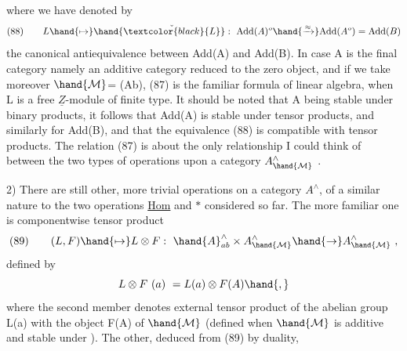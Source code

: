 where we have denoted by
\[
(88)\qquad L\hand{\mapsto}\hand{\check{\textcolor{black}{L}}} : \ \mathrm{Add}(A)^{o}\hand{\xrightarrow{\approx}}\mathrm{Add}(A^{o})= \mathrm{Add}(B)
\]
the canonical antiequivalence between Add(A) and Add(B). In case A is
the final category namely an additive category reduced to the zero object,
 and if we take moreover $\hand{\mathcal{M}}$= (Ab), (87) is the familiar formula of
linear algebra,  when L is a free $\underline{Z}$-module of finite type. It should be
noted that A being stable under binary products, it follows that Add(A)
is stable under tensor products, and similarly for Add(B), and that
the equivalence (88) is compatible with tensor products. The relation
(87) is about the only relationship I could think of between the two types
of operations upon a  category $A^{\wedge}_{\hand{\mathcal{M}}}$ . 

2) There are still  other, more trivial operations on a category $A^{\wedge}$,
of a  similar nature to the two operations \uline{Hom} and $*$ considered so
far. The more familiar one is componentwise tensor product
\[
(89)\qquad (L,F)\hand{\mapsto} L\otimes F : \ \hand{A}^{\wedge}_{ab}\times A^{\wedge}_{\hand{\mathcal{M}}}\hand{\to} A^{\wedge}_{\hand{\mathcal{M}}} \ ,
\]
defined by
\[
L\otimes F\ (a) \ = L(a)\otimes F(A)\hand{,}
\]
where the second member denotes external tensor product of the abelian
group L(a) with the object F(A) of $\hand{\mathcal{M}}$ (defined when $\hand{\mathcal{M}}$ is additive and
stable under ). The other, deduced from (89) by duality,

